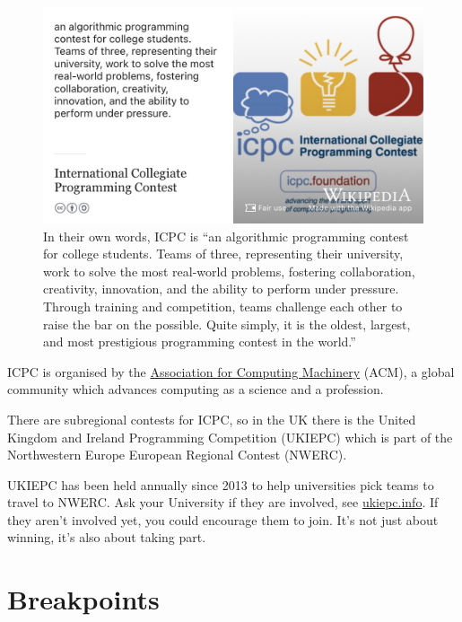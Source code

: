 \documentclass[
]{book}
\begin{document}
\begin{figure}

{\centering \includegraphics[width=0.99\linewidth]{images/International-Collegiate-Programming-Contest} 

}

\caption{In their own words, ICPC is ``an algorithmic programming contest for college students. Teams of three, representing their university, work to solve the most real-world problems, fostering collaboration, creativity, innovation, and the ability to perform under pressure. Through training and competition, teams challenge each other to raise the bar on the possible. Quite simply, it is the oldest, largest, and most prestigious programming contest in the world.'' \citep{icpc}}\label{fig:icpc-fig}
\end{figure}



ICPC is organised by the \href{https://en.wikipedia.org/wiki/Association_for_Computing_Machinery}{Association for Computing Machinery} (ACM), a global community which advances computing as a science and a profession.

There are subregional contests for ICPC, so in the UK there is the United Kingdom and Ireland Programming Competition (UKIEPC) which is part of the Northwestern Europe European Regional Contest (NWERC).

UKIEPC has been held annually since 2013 to help universities pick teams to travel to NWERC. Ask your University if they are involved, see \href{http://ukiepc.info}{ukiepc.info}. If they aren't involved yet, you could encourage them to join. It's not just about winning, it's also about taking part.

\hypertarget{bp10}{%
\section{Breakpoints}\label{bp10}}
\end{document}
